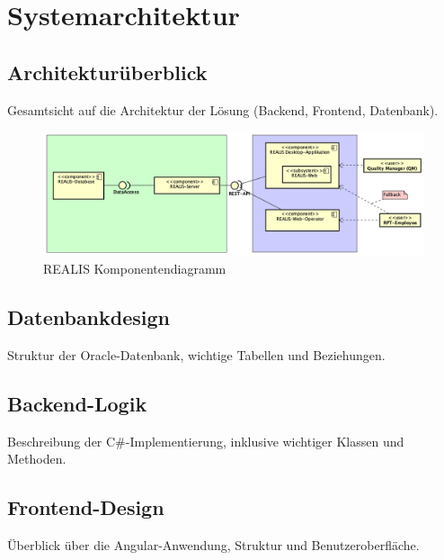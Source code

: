 \chapter{Systemarchitektur}

\section{Architekturüberblick}
Gesamtsicht auf die Architektur der Lösung (Backend, Frontend, Datenbank).

\begin{figure}[!h]
    \centering
    \includegraphics[width=1\textwidth]{bilder/REALIS-Komponentendiagramm.png}
    \caption{REALIS Komponentendiagramm}
    \label{fig:realis-komponentendiagramm}
\end{figure}

\section{Datenbankdesign}
Struktur der Oracle-Datenbank, wichtige Tabellen und Beziehungen.

\section{Backend-Logik}
Beschreibung der C\#-Implementierung, inklusive wichtiger Klassen und Methoden.

\section{Frontend-Design}
Überblick über die Angular-Anwendung, Struktur und Benutzeroberfläche.